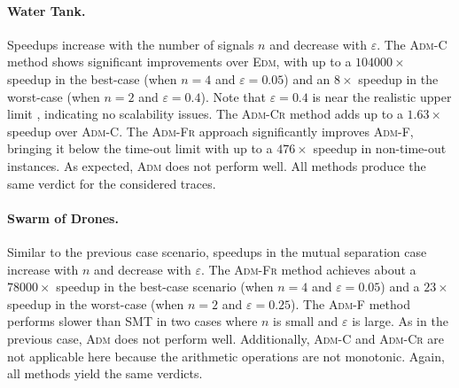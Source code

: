 \paragraph*{Water Tank.}
Speedups increase with the number of signals \(n\) and decrease with \(\varepsilon\).
The \textsc{Adm-C} method shows significant improvements over \textsc{Edm}, with up to a $104000\times$ speedup in the best-case (when \(n=4\) and \(\varepsilon=0.05\)) and an $8\times$ speedup in the worst-case (when \(n=2\) and \(\varepsilon=0.4\)).
Note that \(\varepsilon=0.4\) is near the realistic upper limit \cite{MomtazAB23}, indicating no scalability issues.
The \textsc{Adm-Cr} method adds up to a $1.63\times$ speedup over \textsc{Adm-C}.
The \textsc{Adm-Fr} approach significantly improves \textsc{Adm-F}, bringing it below the time-out limit with up to a $476\times$ speedup in non-time-out instances.
As expected, \textsc{Adm} does not perform well.
All methods produce the same verdict for the considered traces.



\paragraph*{Swarm of Drones.}
Similar to the previous case scenario, speedups in the mutual separation case increase with \(n\) and decrease with \(\varepsilon\).
The \textsc{Adm-Fr} method achieves about a $78000\times$ speedup in the best-case scenario (when \(n=4\) and \(\varepsilon=0.05\)) and a $23\times$ speedup in the worst-case (when \(n=2\) and \(\varepsilon=0.25\)).
The \textsc{Adm-F} method performs slower than SMT in two cases where \(n\) is small and \(\varepsilon\) is large.
%
As in the previous case, \textsc{Adm} does not perform well.
Additionally, \textsc{Adm-C} and \textsc{Adm-Cr} are not applicable here because the arithmetic operations are not monotonic.
Again, all methods yield the same verdicts.

